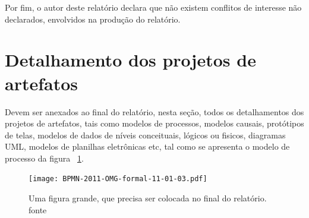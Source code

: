 \documentclass[12pt]{article}
\newcommand{\rascend}{\color{black}}    %
\begin{document}
	Por fim, o autor deste relatório declara que não existem conflitos de interesse não declarados, envolvidos na produção do relatório.
	
	
	
	
	\appendix
	
	
	\section{Detalhamento dos projetos de artefatos\label{Sec:ProjetosArtefatosDetalhados}} \label{Mod:Processos:Graficos}
	
	Devem ser anexados ao final do relatório, nesta seção, todos os detalhamentos dos projetos de artefatos, tais como modelos de processos, modelos causais, protótipos de telas, modelos de dados de níveis conceituais, lógicos ou fisicos, diagramas UML, modelos de planilhas eletrônicas etc, tal como se apresenta o modelo de processo da figura ~\ref{FiguraGrande}.
	
	\begin{figure}[ht]
		\centering
		\texttt{[image: BPMN-2011-OMG-formal-11-01-03.pdf]}
		\caption{Uma figura grande, que precisa ser colocada no final do relatório. fonte \citet[p. 178]{object_management_group_business_2011}\label{FiguraGrande}}
	\end{figure}
	\rascend
\end{document}

